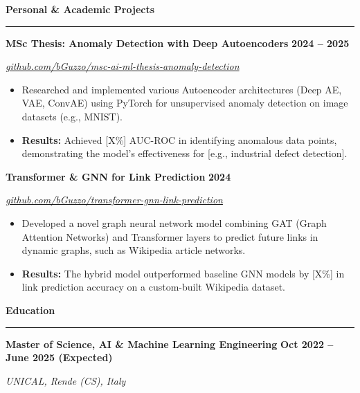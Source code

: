 \documentclass[10pt, a4paper]{article}
\newcommand{\cvsection}[1]{%
  \vspace{8pt} %
  \par %
  {\Large\bfseries\color{sectionblue}#1} %
  \par %
  \vspace{2pt} %
  \hrule %
  \vspace{6pt} %
}
\newcommand{\cvsubsection}[3]{%
  \par %
  {\large\bfseries #1} %
  \hfill %
  {\bfseries #2} %
  \par %
  {\textit{#3}} %
  \vspace{4pt} %
}
\begin{document}
\begin{minipage}[t]{0.68\textwidth}
\cvsection{Personal \& Academic Projects}

\cvsubsection
  {MSc Thesis: Anomaly Detection with Deep Autoencoders} %
  {2024 -- 2025} %
  {\href{https://github.com/bGuzzo/msc-ai-ml-thesis-anomaly-detection}{github.com/bGuzzo/msc-ai-ml-thesis-anomaly-detection}} %

\begin{itemize}[leftmargin=*, nosep]
    \item Researched and implemented various Autoencoder architectures (Deep AE, VAE, ConvAE) using PyTorch for unsupervised anomaly detection on image datasets (e.g., MNIST).
    \item \textbf{Results:} Achieved [X\%] AUC-ROC in identifying anomalous data points, demonstrating the model's effectiveness for [e.g., industrial defect detection].
\end{itemize}

\vspace{6pt} %
\cvsubsection
  {Transformer & GNN for Link Prediction} %
  {2024} %
  {\href{https://github.com/bGuzzo/transformer-gnn-link-prediction}{github.com/bGuzzo/transformer-gnn-link-prediction}} %

\begin{itemize}[leftmargin=*, nosep]
    \item Developed a novel graph neural network model combining GAT (Graph Attention Networks) and Transformer layers to predict future links in dynamic graphs, such as Wikipedia article networks.
    \item \textbf{Results:} The hybrid model outperformed baseline GNN models by [X\%] in link prediction accuracy on a custom-built Wikipedia dataset.
\end{itemize}


\cvsection{Education}

\cvsubsection
  {Master of Science, AI & Machine Learning Engineering} %
  {Oct 2022 -- June 2025 (Expected)} %
  {UNICAL, Rende (CS), Italy} %



\end{minipage}
\end{document}
